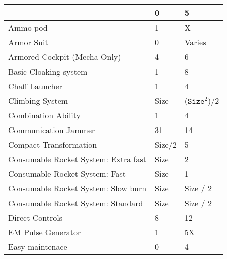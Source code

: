 \documentclass[twoside]{book}
\begin{document}
\begin{longtable}{p{1.25in}ll}
  &
   0 
  &
   5 
  \tabularnewline
  \hline
      
  \raggedright
           Ammo pod 
  &
   1 
  &
   X 
  \tabularnewline
  \hline
      
  \raggedright
           Armor Suit 
  &
   0 
  &
   Varies 
  \tabularnewline
  \hline
      
  \raggedright
           Armored Cockpit (Mecha Only)
           
  &
   4 
  &
   6 
  \tabularnewline
  \hline
      
  \raggedright
           Basic Cloaking system 
  &
   1 
  &
   8 
  \tabularnewline
  \hline
      
  \raggedright
           Chaff Launcher 
  &
   1 
  &
   4 
  \tabularnewline
  \hline
      
  \raggedright
           Climbing System 
  &
   Size 
  &
   (\begin{math}{\texttt{Size}}^{2}\end{math})/2 
  \tabularnewline
  \hline
      
  \raggedright
           Combination Ability 
  &
   1 
  &
   4 
  \tabularnewline
  \hline
      
  \raggedright
           Communication Jammer 
  &
   31 
  &
   14 
  \tabularnewline
  \hline
      
  \raggedright
           Compact Transformation 
  &
   Size/2 
  &
   5 
  \tabularnewline
  \hline
      
  \raggedright
           Consumable Rocket System: Extra
           fast 
  &
   Size 
  &
   2 
  \tabularnewline
  \hline
      
  \raggedright
           Consumable Rocket System: Fast
           
  &
   Size 
  &
   1 
  \tabularnewline
  \hline
      
  \raggedright
           Consumable Rocket System: Slow
           burn 
  &
   Size 
  &
   Size / 2 
  \tabularnewline
  \hline
      
  \raggedright
           Consumable Rocket System:
           Standard 
  &
   Size 
  &
   Size / 2 
  \tabularnewline
  \hline
      
  \raggedright
           Direct Controls 
  &
   8 
  &
   12 
  \tabularnewline
  \hline
      
  \raggedright
           EM Pulse Generator 
  &
   1 
  &
   5X 
  \tabularnewline
  \hline
      
  \raggedright
           Easy maintenace 
  &
   0 
  &
   4 
  \tabularnewline
  \hline
      

\end{longtable}
\end{document}
